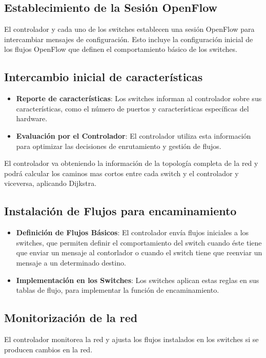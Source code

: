 \documentclass[a4paper, 12pt]{book}
\begin{document}
	\subsection{Establecimiento de la Sesión OpenFlow}
	El controlador y cada uno de los switches establecen una sesión OpenFlow para intercambiar mensajes de configuración. Esto incluye la configuración inicial de los flujos OpenFlow que definen el comportamiento básico de los switches.

	
	\subsection{Intercambio inicial de características}
	\begin{itemize}
		\item \textbf{Reporte de características}: Los switches informan al controlador sobre sus características, como el número de puertos y características específicas del hardware.
		\item \textbf{Evaluación por el Controlador}: El controlador utiliza esta información para optimizar las decisiones de enrutamiento y gestión de flujos.
	\end{itemize}
	
	El controlador va obteniendo la información de la topología completa de la red y podrá calcular los caminos mas cortos entre cada switch y el controlador y viceversa, aplicando Dijkstra.
	
	\subsection{Instalación de Flujos para encaminamiento}
	\begin{itemize}
		\item \textbf{Definición de Flujos Básicos}: El controlador envía flujos iniciales a los switches, que permiten definir el comportamiento del switch cuando éste tiene que enviar un mensaje al contorlador o cuando el switch tiene que reenviar un mensaje a un determinado destino.
		\item \textbf{Implementación en los Switches}: Los switches aplican estas reglas en sus tablas de flujo, para implementar la función de encaminamiento.
	\end{itemize}
	
	\subsection{Monitorización de la red}
		El controlador monitorea la red y ajusta los flujos instalados en los switches si se producen cambios en la red.
	
\end{document}
